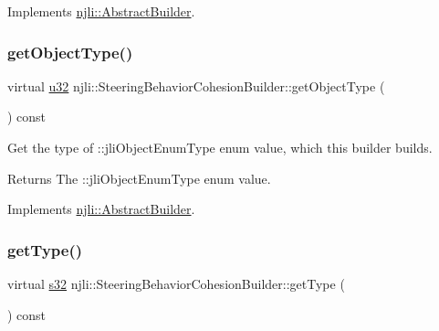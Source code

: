 Implements \mbox{\hyperlink{classnjli_1_1_abstract_builder_a902f73ea78031b06aca183a417f3413b}{njli\+::\+Abstract\+Builder}}.

\mbox{\label{classnjli_1_1_steering_behavior_cohesion_builder_ae6bfb53672094a0161260e92b7fcd966}} 
\subsubsection{\texorpdfstring{get\+Object\+Type()}{getObjectType()}}
{\footnotesize\ttfamily virtual \mbox{\hyperlink{_util_8h_a10e94b422ef0c20dcdec20d31a1f5049}{u32}} njli\+::\+Steering\+Behavior\+Cohesion\+Builder\+::get\+Object\+Type (\begin{DoxyParamCaption}{ }\end{DoxyParamCaption}) const\hspace{0.3cm}{\ttfamily [virtual]}}

Get the type of \+::jli\+Object\+Enum\+Type enum value, which this builder builds.

\begin{DoxyReturn}{Returns}
The \+::jli\+Object\+Enum\+Type enum value. 
\end{DoxyReturn}


Implements \mbox{\hyperlink{classnjli_1_1_abstract_builder_a0f2d344fcf697b167f4f2b1122b5fb33}{njli\+::\+Abstract\+Builder}}.

\mbox{\label{classnjli_1_1_steering_behavior_cohesion_builder_ab6822284ca24cdb64af18303ad52e197}} 
\subsubsection{\texorpdfstring{get\+Type()}{getType()}}
{\footnotesize\ttfamily virtual \mbox{\hyperlink{_util_8h_aa62c75d314a0d1f37f79c4b73b2292e2}{s32}} njli\+::\+Steering\+Behavior\+Cohesion\+Builder\+::get\+Type (\begin{DoxyParamCaption}{ }\end{DoxyParamCaption}) const\hspace{0.3cm}{\ttfamily [virtual]}}

